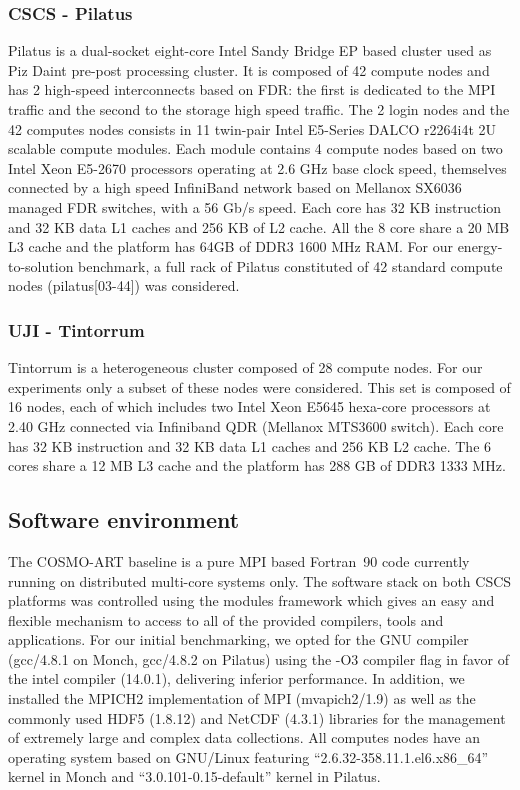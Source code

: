 \subsubsection{CSCS - Pilatus} 
Pilatus  is  a dual-socket  eight-core  Intel  Sandy  Bridge EP  based
cluster used as Piz Daint pre-post processing cluster.  It is composed
of 42 compute  nodes and has 2 high-speed  interconnects based on FDR:
the  first is  dedicated to  the  MPI traffic  and the  second to  the
storage high  speed traffic.   The 2 login  nodes and the  42 computes
nodes  consists in  11  twin-pair Intel  E5-Series  DALCO r2264i4t  2U
scalable compute modules.  Each  module contains 4 compute nodes based
on two Intel  Xeon E5-2670 processors operating at  2.6 GHz base clock
speed, themselves  connected by a high speed  InfiniBand network based
on Mellanox  SX6036 managed FDR switches,  with a 56  Gb/s speed. Each
core has 32 KB  instruction and 32 KB data L1 caches  and 256 KB of L2
cache.  All  the 8 core share  a 20 MB  L3 cache and the  platform has
64GB of  DDR3 1600 MHz  RAM.  For our energy-to-solution  benchmark, a
full  rack  of  Pilatus  constituted  of  42  standard  compute  nodes
(pilatus[03-44]) was considered.

\subsubsection{UJI - Tintorrum} 
Tintorrum  is a heterogeneous  cluster composed  of 28  compute nodes.
For our experiments only a subset of these nodes were considered. This
set is  composed of 16  nodes, each of  which includes two  Intel Xeon
E5645 hexa-core  processors at 2.40  GHz connected via  Infiniband QDR
(Mellanox MTS3600 switch).  Each core  has 32 KB instruction and 32 KB
data L1 caches and 256 KB L2 cache. The 6 cores share a 12 MB L3 cache
and the platform has 288 GB of DDR3 1333 MHz.

\subsection{Software environment}
\label{subsec:3.2}

The COSMO-ART baseline  is a pure MPI based  Fortran~90 code currently
running on distributed multi-core systems only.  The software stack on
both CSCS  platforms was controlled using the  modules framework which
gives an easy and flexible mechanism  to access to all of the provided
compilers, tools  and applications.  For our  initial benchmarking, we
opted for the GNU compiler  (gcc/4.8.1 on Monch, gcc/4.8.2 on Pilatus)
using the -O3  compiler flag in favor of  the intel compiler (14.0.1),
delivering inferior performance.  In addition, we installed the MPICH2
implementation of MPI (mvapich2/1.9) as well as the commonly used HDF5
(1.8.12) and NetCDF (4.3.1)  libraries for the management of extremely
large  and  complex data  collections.   All  computes  nodes have  an
operating      system      based      on      GNU/Linux      featuring
``2.6.32-358.11.1.el6.x86\_64''      kernel      in     Monch      and
``3.0.101-0.15-default'' kernel in Pilatus.

